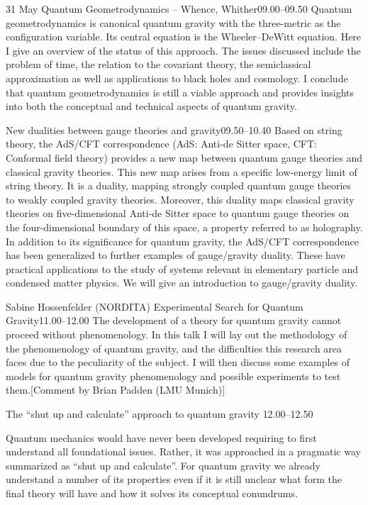 \documentclass{conference}
\begin{document}
\MakeTitle

\vfill
\begin{Day}{31 May}
    {Quantum Geometrodynamics -- Whence, Whither}{09.00--09.50}
        {Quantum geometrodynamics is canonical quantum gravity with the
three-metric as the configuration variable. Its central equation is
the Wheeler--DeWitt equation. Here I give an overview of
the status of this approach. The issues discussed
include the
problem of time, the relation to the covariant theory, the
semiclassical approximation as well as applications to black holes and
cosmology. I conclude that quantum
geometrodynamics is still a viable approach and provides insights into
both the conceptual and technical aspects of quantum gravity.}

    {New dualities between gauge theories and gravity}{09.50--10.40}
    {Based on string theory, the AdS/CFT correspondence (AdS: Anti-de Sitter space, CFT: Conformal field theory) provides a new map between quantum gauge theories and classical gravity theories. This new map arises from a specific low-energy limit of string theory. It is a duality, mapping strongly coupled quantum gauge theories to weakly coupled gravity theories. Moreover, this duality maps classical gravity theories on five-dimensional Anti-de Sitter space to quantum gauge theories on the four-dimensional boundary of this space, a property referred to as holography. In addition to its significance for quantum gravity, the AdS/CFT correspondence has been generalized to further examples of gauge/gravity duality. These have practical applications to the study of systems relevant in elementary particle and condensed matter physics. We will give an introduction to gauge/gravity duality.}


    {Sabine Hossenfelder (NORDITA)}
    {Experimental Search for Quantum Gravity}{11.00--12.00}
    {The development of a theory for quantum gravity cannot proceed
without phenomenology. In this talk I will lay out the methodology
of the phenomenology of quantum gravity, and the difficulties
this research area faces due to the peculiarity of the subject. I
will then discuss some examples of models for quantum gravity 
phenomenology and possible experiments to test them.}[Comment by Brian Padden (LMU Munich)]

  {The ``shut up and calculate'' approach to quantum gravity}
  {12.00--12.50}
  {Quantum mechanics would have never been developed requiring to first understand all foundational issues. Rather, it was approached in a pragmatic way summarized as “shut up and calculate”. For quantum gravity we already understand a number of its properties even if it is still unclear what form the final theory will have and how it solves its conceptual conundrums.

}
\end{Day}
\end{document}
